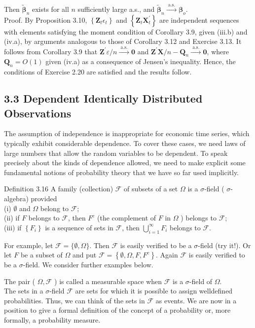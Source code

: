 \documentclass[10pt]{article}
\begin{document}
Then $\tilde{\boldsymbol{\beta}}_{n}$ exists for all $n$ sufficiently large a.s., and $\tilde{\boldsymbol{\beta}}_{n} \xrightarrow{\text { a.s. }} \boldsymbol{\beta}_{o}$.\\
Proof. By Proposition 3.10, $\left\{\mathbf{Z}_{t} \epsilon_{t}\right\}$ and $\left\{\mathbf{Z}_{t} \mathbf{X}_{t}^{\prime}\right\}$ are independent sequences with elements satisfying the moment condition of Corollary 3.9, given (iii.b) and (iv.a), by arguments analogous to those of Corollary 3.12 and Exercise 3.13. It follows from Corollary 3.9 that $\mathbf{Z}^{\prime} \varepsilon / n \xrightarrow{\text { a.s. }} \mathbf{0}$ and $\mathbf{Z}^{\prime} \mathbf{X} / n-\mathbf{Q}_{n} \xrightarrow{\text { a.s. }} \mathbf{0}$, where $\mathbf{Q}_{n}=O(1)$ given (iv.a) as a consequence of Jensen's inequality. Hence, the conditions of Exercise 2.20 are satisfied and the results follow.

\subsection*{3.3 Dependent Identically Distributed Observations}
The assumption of independence is inappropriate for economic time series, which typically exhibit considerable dependence. To cover these cases, we need laws of large numbers that allow the random variables to be dependent. To speak precisely about the kinds of dependence allowed, we need to make explicit some fundamental notions of probability theory that we have so far used implicitly.

Definition 3.16 A family (collection) $\mathcal{F}$ of subsets of a set $\Omega$ is a $\sigma$-field ( $\sigma$-algebra) provided\\
(i) $\emptyset$ and $\Omega$ belong to $\mathcal{F}$;\\
(ii) if $F$ belongs to $\mathcal{F}$, then $F^{c}$ (the complement of $F$ in $\Omega$ ) belongs to $\mathcal{F}$;\\
(iii) if $\left\{F_{i}\right\}$ is a sequence of sets in $\mathcal{F}$, then $\bigcup_{i=1}^{\infty} F_{i}$ belongs to $\mathcal{F}$.

For example, let $\mathcal{F}=\{\emptyset, \Omega\}$. Then $\mathcal{F}$ is easily verified to be a $\sigma$-field (try it!). Or let $F$ be a subset of $\Omega$ and put $\mathcal{F}=\left\{\emptyset, \Omega, F, F^{c}\right\}$. Again $\mathcal{F}$ is easily verified to be a $\sigma$-field. We consider further examples below.

The pair ( $\Omega, \mathcal{F}$ ) is called a measurable space when $\mathcal{F}$ is a $\sigma$-field of $\Omega$.\\
The sets in a $\sigma$-field $\mathcal{F}$ are sets for which it is possible to assign welldefined probabilities. Thus, we can think of the sets in $\mathcal{F}$ as events. We are now in a position to give a formal definition of the concept of a probability or, more formally, a probability measure.
\end{document}

